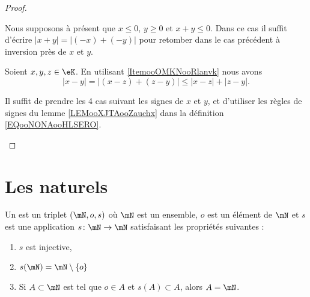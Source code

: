 \begin{proof}
\begin{subproof}
\begin{enumerate}
			      Nous supposons à présent que \( x\leq 0\), \( y\geq 0\) et \( x+y\leq 0\). Dans ce cas il suffit d'écrire \( | x+y |=| (-x)+(-y) |\) pour retomber dans le cas précédent à inversion près de \( x\) et \( y\).
		\end{enumerate}

		Soient \( x,y,z\in \eK\). En utilisant \ref{ItemooOMKNooRlanvk} nous avons
		\begin{equation}
			| x-y |= |  (x-z)+(z-y) |\leq | x-z |+| z-y |.
		\end{equation}

		Il suffit de prendre les 4 cas suivant les signes de \( x\) et \( y\), et d'utiliser les règles de signes du lemme \ref{LEMooXJTAooZauchx} dans la définition \eqref{EQooNONAooHLSERO}.
	\end{subproof}
\end{proof}




\section{Les naturels}
\label{SECooPJSYooNYaIaq}

\begin{definition}     \label{DEFooBJBOooWlblAx}
	Un  est un triplet \( (\mN, o, s)\) où \( \mN\) est un ensemble, \( o\) est un élément de \( \mN\) et \( s\) est une application \( s\colon \mN\to \mN\) satisfaisant les propriétés suivantes :
	\begin{enumerate}
		\item
		      \( s\) est injective,
		\item       \label{ITEMooQAKJooGKdJsM}
		      \( s(\mN)=\mN\setminus \{ o \} \)
		\item       \label{ITEMooXPYEooFajywh}
		      Si \( A\subset \mN\) est tel que \( o\in A\) et \( s(A)\subset A\), alors \( A=\mN\).
	\end{enumerate}
\end{definition}

